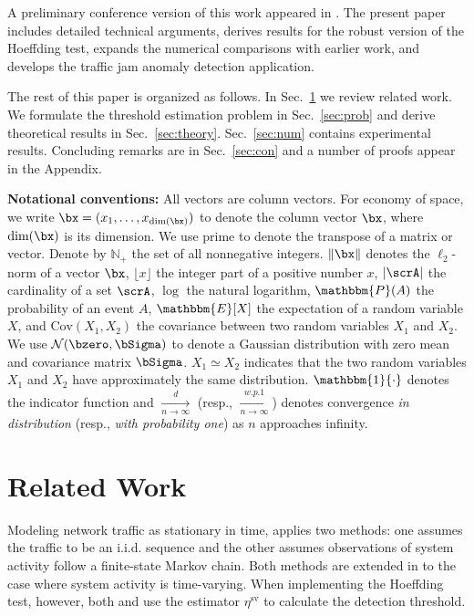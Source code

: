\documentclass[10pt, twocolumn]{IEEEtran}
\begin{document}
A preliminary conference version of this work appeared in
\cite{zh-pas-cdc15}. The present paper includes detailed technical
arguments, derives results for the robust version of the Hoeffding test,
expands the numerical comparisons with earlier work, and develops the
traffic jam anomaly detection application.

The rest of this paper is organized as follows. In Sec.~\ref{sec:liter}
we review related work. We formulate the threshold estimation problem in
Sec.~\ref{sec:prob} and derive theoretical results in
Sec.~\ref{sec:theory}. Sec.~\ref{sec:num} contains experimental
results. Concluding remarks are in Sec.~\ref{sec:con} and a number of
proofs appear in the Appendix.

\textbf{Notational conventions:} All vectors are column vectors. For
economy of space, we write $\bx = (x_1, \ldots, x_{\text{dim}(\bx)})$ to
denote the column vector $\bx$, where $\text{dim}(\bx)$ is its
dimension. We use prime to denote the transpose of a matrix or
vector. Denote by $\mathbb{N_+}$ the set of all nonnegative
integers. {$\|\bx\|$ denotes the $\ell_2$-norm of a vector $\bx$,
  $\lfloor x \rfloor$ the integer part of a positive number $x$, $|
  \scrA |$ the cardinality of a set $\scrA$}, $\log$ the natural
logarithm, $\mathbbm{P}(A)$ the probability of an event $A$,
$\mathbbm{E}[X]$ the expectation of a random variable $X$, and
$\text{Cov}(X_1, X_2)$ the covariance between two random variables $X_1$
and $X_2$. We use $\mathcal{N}(\bzero, \bSigma)$ to denote a Gaussian
distribution with zero mean and covariance matrix $\bSigma$. $X_1 \simeq
X_2$ indicates that the two random variables $X_1$ and $X_2$ have
approximately the same distribution. $\mathbbm{1}\{\cdot\}$ denotes the
indicator function and $\xrightarrow[{n \to \infty }]{\textit{d}}$
(resp., $\xrightarrow[{n \to \infty }]{{\textit{w.p.1}}}$) denotes
convergence \textit{in distribution} (resp., \textit{with probability
  one}) as $n$ approaches infinity.


\section{Related Work} \label{sec:liter} 

Modeling network traffic as stationary in time, \cite{pas-sma-ton-09}
applies two methods: one assumes the traffic to be an i.i.d.  sequence
and the other assumes observations of system activity follow a
finite-state Markov chain. Both methods are extended in
\cite{robust-anomaly-tcns} to the case where system activity is
time-varying. When implementing the Hoeffding test, however, both
\cite{pas-sma-ton-09} and \cite{robust-anomaly-tcns} use the estimator
$\eta^{\text{sv}}$ to calculate the detection threshold.
 
\end{document}
